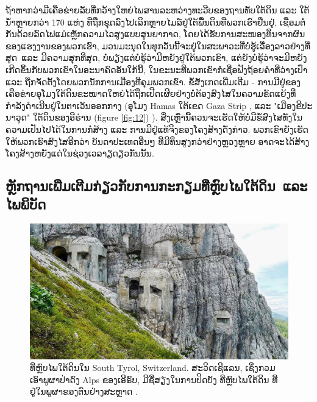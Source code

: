 \documentclass[10pt,twocolumn,letterpaper]{article}
\begin{document}
ຖ້າຫາກວ່າມີເຄືອຂ່າຍລັບທີ່ກວ້າງໃຫຍ່ໄພສານລະຫວ່າງທະວີບຂອງຖານທັບໃຕ້ດິນ ແລະ ໃຕ້ນ້ຳຫຼາຍກວ່າ 170 ແຫ່ງ ທີ່ຖືກຂຸດລົງໄປເລິກຫຼາຍໄມລ໌ຢູ່ໃຕ້ພື້ນດິນທີ່ພວກເຮົາຢືນຢູ່, ເຊື່ອມຕໍ່ກັນດ້ວຍລົດໄຟແມ່ເຫຼັກຄວາມໄວສູງແບບສູນຍາກາດ, ໂດຍໄດ້ຮັບການສະໜອງທຶນຈາກຜົນຂອງແຮງງານຂອງພວກເຮົາ, ມວນມະນຸດໃນທຸກວັນນີ້ຈະຢູ່ໃນສະພາວະທີ່ບໍ່ຮູ້ເລື່ອງລາວຢ່າງທີ່ສູດ ແລະ ມີຄວາມສຸກທີ່ສຸດ, \cite{123} ບໍ່ພຽງແຕ່ບໍ່ຮູ້ວ່າມີຫຍັງຢູ່ໃຕ້ພວກເຂົາ, ແຕ່ຍັງບໍ່ຮູ້ວ່າຈະມີຫຍັງເກີດຂຶ້ນກັບພວກເຂົາໃນອະນາຄົດອັນໃກ້ນີ້, ໃນຂະນະທີ່ພວກເຂົາກໍ່ເຊື່ອຟັງຖ້ອຍຄຳທີ່ວ່າງເປົ່າ ແລະ ຖືກຈັດຕັ້ງໂດຍພວກນັກການເມືອງທີ່ຄຸມພວກເຂົາ.
ຂໍ້ສັງເກດເພີ່ມເຕີມ - ການມີຢູ່ຂອງເຄືອຂ່າຍອຸໂມງໃຕ້ດິນຂະໜາດໃຫຍ່ໄດ້ຖືກເປີດເຜີຍຢ່າງບໍ່ຕ້ອງສົງໄສໃນຄວາມຂັດແຍ້ງທີ່ກຳລັງດຳເນີນຢູ່ໃນຕາເວັນອອກກາງ (ອຸໂມງ Hamas ໃຕ້ເຂດ Gaza Strip  \cite{38},  ແລະ "ເມືອງຂີປະນາວຸດ" ໃຕ້ດິນຂອງອີຣ່ານ
 (figure \ref{fig:12}) \cite{39,40}).  \cite{124}
ສິ່ງເຫຼົ່ານີ້ຄວນຈະເຮັດໃຫ້ບໍ່ມີຂໍ້ສົງໄສທັງໃນຄວາມເປັນໄປໄດ້ໃນການກໍ່ສ້າງ ແລະ ການມີຢູ່ແທ້ຈິງຂອງໂຄງສ້າງດັ່ງກ່າວ. \cite{125}
ພວກເຂົາຍັງເຮັດໃຫ້ພວກເຮົາສົງໄສອີກວ່າ ບັນດາປະເທດອື່ນໆ ທີ່ມີທຶນສູງກວ່າຢ່າງຫຼວງຫຼາຍ ອາດຈະໄດ້ສ້າງໂຄງສ້າງຫຍັງແດ່ໃນຊ່ວງເວລາຽດຽວກັນນັ້ນ. \cite{126}
\subsection{ຫຼັກຖານເພີ່ມເຕີມກ່ຽວກັບການກະກຽມທີ່ຫຼົບໄພໃຕ້ດິນ ແລະ ໄພພິບັດ}

\begin{figure}[t]
\begin{center}
   \includegraphics[width=1\linewidth]{tyrol.jpg}
\end{center}
   \caption{ທີ່ຫຼົບໄພໃຕ້ດິນໃນ South Tyrol, Switzerland.
ສະວິດເຊີແລນ, ເຊິ່ງກວມເອົາພູຜາປ່າດົງ Alps ຂອງເອີຣົບ, ມີຊື່ສຽງໃນການປິດບັງ ທີ່ຫຼົບໄພໃຕ້ດິນ ທີ່ຢູ່ໃນພູຜາຂອງຕົນຢ່າງສະຫຼາດ \cite{32}. \cite{128}}
\label{fig:7}
\label{fig:onecol}
\end{figure}
\end{document}
